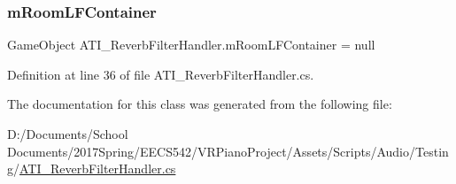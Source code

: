 \subsubsection{\texorpdfstring{m\+Room\+L\+F\+Container}{mRoomLFContainer}}
{\footnotesize\ttfamily Game\+Object A\+T\+I\+\_\+\+Reverb\+Filter\+Handler.\+m\+Room\+L\+F\+Container = null\hspace{0.3cm}{\ttfamily [private]}}



Definition at line 36 of file A\+T\+I\+\_\+\+Reverb\+Filter\+Handler.\+cs.



The documentation for this class was generated from the following file\+:\begin{DoxyCompactItemize}
\item 
D\+:/\+Documents/\+School Documents/2017\+Spring/\+E\+E\+C\+S542/\+V\+R\+Piano\+Project/\+Assets/\+Scripts/\+Audio/\+Testing/\hyperlink{_a_t_i___reverb_filter_handler_8cs}{A\+T\+I\+\_\+\+Reverb\+Filter\+Handler.\+cs}\end{DoxyCompactItemize}

